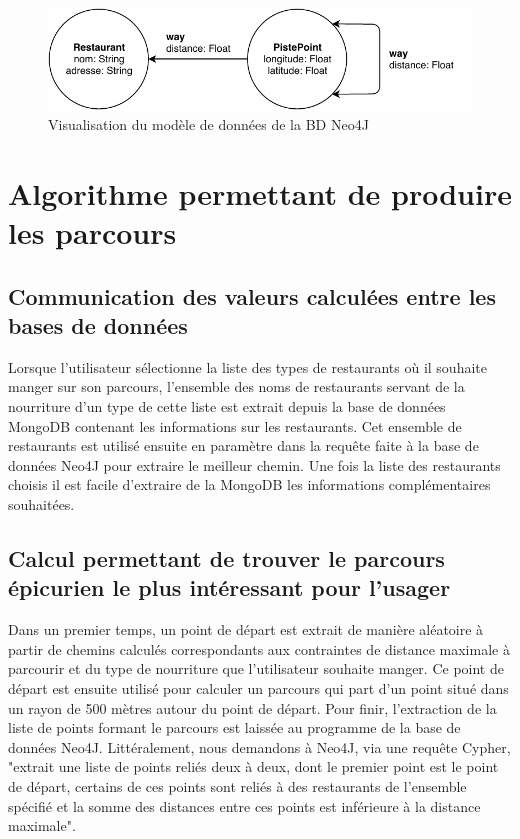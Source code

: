 \documentclass[12pt]{article}
\begin{document}
    \begin{figure}[h]
        \centering
        \includegraphics[scale=1]{images/actual_neo_model.pdf}
        \caption{\label{actual_neo_model} Visualisation du modèle de données de la BD Neo4J}
    \end{figure}

\section{Algorithme permettant de produire les parcours}

\subsection{Communication des valeurs calculées entre les bases de données}

    Lorsque l'utilisateur sélectionne la liste des types de restaurants où il souhaite manger sur son parcours, l'ensemble des noms de restaurants servant de la nourriture d'un type de cette liste est extrait depuis la base de données MongoDB contenant les informations sur les restaurants. Cet ensemble de restaurants est utilisé ensuite en paramètre dans la requête faite à la base de données Neo4J pour extraire le meilleur chemin.
    Une fois la liste des restaurants choisis il est facile d'extraire de la MongoDB les informations complémentaires souhaitées.

\subsection{Calcul permettant de trouver le parcours épicurien le plus intéressant pour l'usager}

    Dans un premier temps, un point de départ est extrait de manière aléatoire à partir de chemins calculés correspondants aux contraintes de distance maximale à parcourir et du type de nourriture que l'utilisateur souhaite manger.
    Ce point de départ est ensuite utilisé pour calculer un parcours qui part d'un point situé dans un rayon de 500 mètres autour du point de départ. Pour finir, l'extraction de la liste de points formant le parcours est laissée au programme de la base de données Neo4J. Littéralement, nous demandons à Neo4J, via une requête Cypher, "extrait une liste de points reliés deux à deux, dont le premier point est le point de départ, certains de ces points sont reliés à des restaurants de l'ensemble spécifié et la somme des distances entre ces points est inférieure à la distance maximale".  
\end{document}
